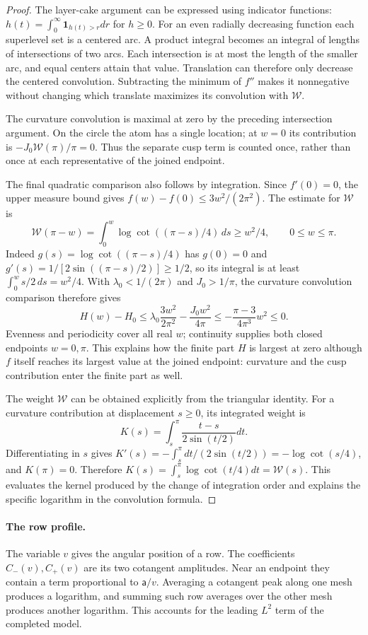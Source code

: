 \begin{proof}
The layer-cake argument can be expressed using indicator functions:
$h(t)=\int_0^\infty\mathbf1_{h(t)>r}dr$ for $h\geq0$.
For an even radially decreasing function each superlevel set is a
centered arc. A product integral becomes an integral of lengths of
intersections of two arcs. Each intersection is at most the length of
the smaller arc, and equal centers attain that value. Translation can
therefore only decrease the centered convolution. Subtracting the
minimum of $f''$ makes it nonnegative without changing which translate
maximizes its convolution with $\mathcal{W}$.

The curvature convolution is maximal at zero by the preceding
intersection argument. On the circle the atom has a single location;
at $w=0$ its contribution is $-J_0\mathcal W(\pi)/\pi=0$.
Thus the separate cusp term is counted once, rather than once at each
representative of the joined endpoint.

The final quadratic comparison also follows by integration. Since
$f'(0)=0$, the upper measure bound gives
$f(w)-f(0)\leq3w^2/(2\pi^2)$. The estimate for $\mathcal{W}$ is
\[
 \mathcal{W}(\pi-w)=\int_0^w\log\cot((\pi-s)/4)\,ds\geq w^2/4,
 \qquad 0\leq w\leq\pi.
\]
Indeed $g(s)=\log\cot((\pi-s)/4)$ has $g(0)=0$ and
$g'(s)=1/[2\sin((\pi-s)/2)]\geq1/2$, so its integral is at least
$\int_0^w s/2\,ds=w^2/4$.
With $\lambda_0<1/(2\pi)$ and $J_0>1/\pi$, the curvature
convolution comparison therefore gives
\[
 H(w)-H_0\leq\lambda_0\frac{3w^2}{2\pi^2}
                 -\frac{J_0w^2}{4\pi}
 \leq-\frac{\pi-3}{4\pi^3}w^2\leq0.
\]
Evenness and periodicity cover all real $w$; continuity supplies both
closed endpoints $w=0,\pi$.
This explains how the finite part $H$ is largest at zero although
$f$ itself reaches its largest value at the joined endpoint: curvature
and the cusp contribution enter the finite part as well.

The weight $\mathcal{W}$ can be obtained explicitly from the triangular
identity. For a curvature contribution at displacement $s\geq0$,
its integrated weight is
\[
 K(s)=\int_s^\pi\frac{t-s}{2\sin(t/2)}dt.
\]
Differentiating in $s$ gives
$K'(s)=-\int_s^\pi dt/(2\sin(t/2))=-\log\cot(s/4)$,
and $K(\pi)=0$. Therefore
$K(s)=\int_s^\pi\log\cot(t/4)dt=\mathcal{W}(s)$. This evaluates the
kernel produced by the change of integration order and explains the
specific logarithm in the convolution formula.
\end{proof}

\paragraph{The row profile.}
The variable $v$ gives the angular position of a row. The coefficients
$C_-(v),C_+(v)$ are its two cotangent amplitudes. Near an endpoint they
contain a term proportional to $\mathsf{a}/v$. Averaging a cotangent peak along
one mesh produces a logarithm, and summing such row averages over the
other mesh produces another logarithm. This accounts for the leading
$L^2$ term of the completed model.

